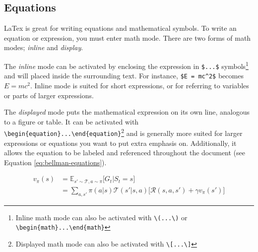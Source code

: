 \subsection{Equations}
\label{app:equations}

LaTex is great for writing equations and mathematical symbols.
To write an equation or expression, you must enter math mode.
There are two forms of math modes; \textit{inline} and \textit{display}.

The \textit{inline} mode can be activated by enclosing the expression in \verb|$...$| symbols\footnote{Inline math mode can also be activated with \verb|\(...\)| or \verb|\begin{math}...\end{math}|} and will placed inside the surrounding text.
For instance, \verb|$E = mc^2$| becomes $E=mc^2$.
Inline mode is suited for short expressions, or for referring to variables or parts of larger expressions.

The \textit{displayed} mode puts the mathematical expression on its own line, analogous to a figure or table.
It can be activated with \verb|\begin{equation}...\end{equation}|\footnote{Displayed math mode can also be activated with \verb|\[...\]|} and is generally more suited for larger expressions or equations you want to put extra emphasis on.
Additionally, it allows the equation to be labeled and referenced throughout the document (see Equation \ref{eq:bellman-equations}).

\begin{equation}
    \begin{split}
        v_\pi(s) & = \mathbb{E}_{s' \sim \mathcal{T}, a \sim \pi} \big[ G_t | S_t = s \big] \\
        & = \sum_{a,s'}
        {
            \pi(a|s) \mathcal{T}(s'|s,a)
            \big[
                \mathcal{R}(s, a, s') + \gamma v_\pi(s')
                \big]
        }
    \end{split}
    \label{eq:bellman-equations}
\end{equation}

